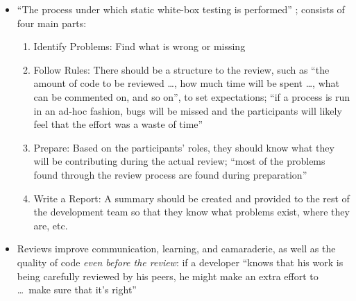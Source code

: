\begin{itemize}
      \item ``The process under which static white-box testing is performed''
            \citep[p.~92]{Patton2006}; consists of four main parts:

            \begin{enumerate}
                  \item Identify Problems: Find what is wrong or missing
                  \item Follow Rules: There should be a structure to the review,
                        such as ``the amount of code to be reviewed \dots, how
                        much time will be spent \dots, what can be commented on,
                        and so on'', to set expectations; ``if a process is run
                        in an ad-hoc fashion, bugs will be missed and the
                        participants will likely feel that the effort was a
                        waste of time''
                  \item Prepare: Based on the participants' roles, they should
                        know what they will be contributing during the actual
                        review; ``most of the problems found through the review
                        process are found during preparation''
                  \item Write a Report: A summary should be created and provided
                        to the rest of the development team so that they know
                        what problems exist, where they are, etc.
                        \citep[p.~93]{Patton2006}
            \end{enumerate}

      \item Reviews improve communication, learning, and camaraderie, as well as
            the quality of code \emph{even before the review}: if a developer
            ``knows that his work is being carefully reviewed by his peers, he
            might make an extra effort to \dots\ make sure that it's right''
            \citep[pp.~93-94]{Patton2006}


\end{itemize}
